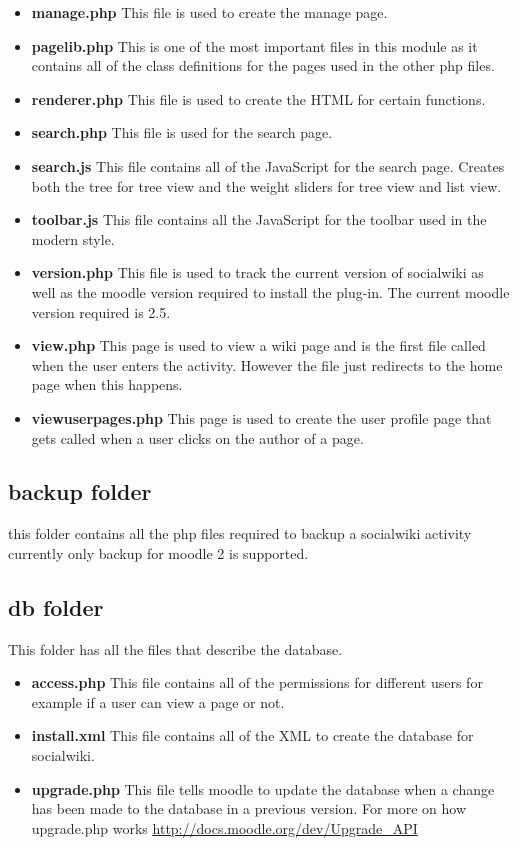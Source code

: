 \documentclass[letterpaper,twoside,11pt]{article}
\begin{document}
\begin{itemize}
	\item \textbf{manage.php}
	This file is used to create the manage page.
	\item \textbf{pagelib.php}
	This is one of the most important files in this module as it contains all of the class definitions for the pages used in the other php files.
	\item \textbf{renderer.php}	
	This file is used to create the HTML for certain functions.
	\item \textbf{search.php}
	This file is used for the search page.
	\item \textbf{search.js}
	This file contains all of the JavaScript for the search page. Creates both the tree for tree view and the weight sliders for tree view and list view.
	\item \textbf{toolbar.js}
	This file contains all the JavaScript for the toolbar used in the modern style.
	\item \textbf{version.php}
	This file is used to track the current version of socialwiki as well as the moodle version required to install the plug-in. The current moodle version required is 2.5.
	\item \textbf{view.php}
	This page is used to view a wiki page and is the first file called when the user enters the activity. However the file just redirects to the home page when this happens.
	\item \textbf{viewuserpages.php}
	This page is used to create the user profile page that gets called when a user clicks on the author of a page.
\end{itemize}	
	\subsection{backup folder}
	this folder contains all the php files required to backup a socialwiki activity
	currently only backup for moodle 2 is supported.
	\subsection{db folder}
	This folder has all the files that describe the database.
\begin{itemize}	
\item \textbf{access.php}
	This file contains all of the permissions for different users for example if a user can view a page or not.
	\item \textbf{install.xml}
	This file contains all of the XML to create the database for socialwiki.
	\item \textbf{upgrade.php}
	This file tells moodle to update the database when a change has been made to the database in a previous version. For more on how upgrade.php works \url{http://docs.moodle.org/dev/Upgrade_API}
\end{itemize}
\end{document}
